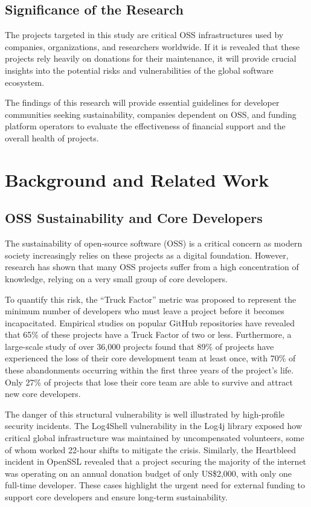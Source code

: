 \documentclass[11pt]{ist-thesis-lt}
\begin{document}
\subsection{Significance of the Research}
The projects targeted in this study are critical OSS infrastructures used by companies, organizations, and researchers worldwide. If it is revealed that these projects rely heavily on donations for their maintenance, it will provide crucial insights into the potential risks and vulnerabilities of the global software ecosystem.

The findings of this research will provide essential guidelines for developer communities seeking sustainability, companies dependent on OSS, and funding platform operators to evaluate the effectiveness of financial support and the overall health of projects.

\section{Background and Related Work}

\subsection{OSS Sustainability and Core Developers}

The sustainability of open-source software (OSS) is a critical concern as modern society increasingly relies on these projects as a digital foundation\cite{sample}. However, research has shown that many OSS projects suffer from a high concentration of knowledge, relying on a very small group of core developers. 

To quantify this risk, the ``Truck Factor'' metric\cite{sample} was proposed to represent the minimum number of developers who must leave a project before it becomes incapacitated\cite{sample}. Empirical studies on popular GitHub repositories have revealed that 65\% of these projects have a Truck Factor of two or less\cite{sample}. Furthermore, a large-scale study of over 36,000 projects found that 89\% of projects have experienced the loss of their core development team at least once, with 70\% of these abandonments occurring within the first three years of the project's life\cite{sample}. Only 27\% of projects that lose their core team are able to survive and attract new core developers\cite{sample}.

The danger of this structural vulnerability is well illustrated by high-profile security incidents. The Log4Shell vulnerability in the Log4j library exposed how critical global infrastructure was maintained by uncompensated volunteers, some of whom worked 22-hour shifts to mitigate the crisis\cite{sample}. Similarly, the Heartbleed incident in OpenSSL revealed that a project securing the majority of the internet was operating on an annual donation budget of only US\$2,000, with only one full-time developer\cite{sample}. These cases highlight the urgent need for external funding to support core developers and ensure long-term sustainability\cite{sample}.
\end{document}
